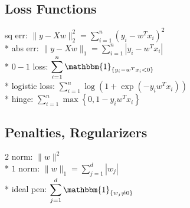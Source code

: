 \documentclass{article}
\begin{document}
\subsection{Loss Functions}
sq err: $\| y - X w \|_{2}^{2} = \displaystyle\sum_{i=1}^{n} \left(y_{i} - w^{T} x_{i}\right)^{2}$
\\* abs err: $\| y - X w \|_{1} = \displaystyle\sum_{i=1}^{n} | y_{i} - w^{T} x_{i} |$
\\* $0-1$ loss: $\displaystyle\sum_{i=1}^{n} \mathbbm{1}_{\left\{y_{i} - w^{T} x_{i} < 0\right\}}$
\\* logistic loss: $\displaystyle\sum_{i=1}^{n} \log\left(1 + \exp\left(- y_{i} w^{T} x_{i}\right)\right)$
\\* hinge: $\displaystyle\sum_{i=1}^{n} \displaystyle\max\left\{0, 1 - y_{i} w^{T} x_{i}\right\}$



\subsection{Penalties, Regularizers}
$2$ norm: $\| w \|^{2}$
\\* $1$ norm: $\| w \|_{1} = \displaystyle\sum_{j=1}^{d} | w_{j} |$
\\* ideal pen: $\displaystyle\sum_{j=1}^{d} \mathbbm{1}_{\left\{w_{j} \neq  0\right\}}$
\end{document}
